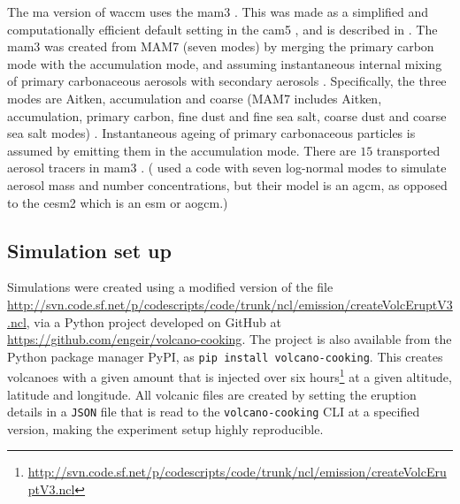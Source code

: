 \documentclass[twocol]{ametsocV5}
\begin{document}
The \acrshort{ma} version of \acrshort{waccm} uses the \acrfull{mam3}
\citep{gettleman2019}. This was made as a simplified and computationally efficient
default setting in the \acrshort{cam5} \citep{liu2016}, and is described in
\citet{liu2012}. The \acrshort{mam3} was created from MAM7 (seven modes) by merging the
primary carbon mode with the accumulation mode, and assuming instantaneous internal
mixing of primary carbonaceous aerosols with secondary aerosols \citep{liu2016}.
Specifically, the three modes are Aitken, accumulation and coarse (MAM7 includes Aitken,
accumulation, primary carbon, fine dust and fine sea salt, coarse dust and coarse sea
salt modes) \citep{liu2016}. Instantaneous ageing of primary carbonaceous particles is
assumed by emitting them in the accumulation mode. There are \(15\) transported aerosol
tracers in \acrshort{mam3} \citep{liu2016}. (\citet{marshall2019, marshall2020,
  marshall2021} used a code with seven log-normal modes to simulate aerosol mass and
number concentrations, but their model is an \acrfull{agcm}, as opposed to the
\acrshort{cesm2} which is an \acrfull{esm} or \acrfull{aogcm}.)

\subsection{Simulation set up}

Simulations were created using a modified version of the file
\url{http://svn.code.sf.net/p/codescripts/code/trunk/ncl/emission/createVolcEruptV3.ncl},
via a Python project developed on GitHub at
\url{https://github.com/engeir/volcano-cooking}. The project is also available from the
Python package manager PyPI, as \texttt{pip install volcano-cooking}. This creates
volcanoes with a given  amount that is injected over six
hours\footnote{\url{http://svn.code.sf.net/p/codescripts/code/trunk/ncl/emission/createVolcEruptV3.ncl}}
at a given altitude, latitude and longitude. All volcanic  files are created by
setting the eruption details in a \texttt{JSON} file that is read to the
\texttt{volcano-cooking} CLI at a specified version, making the experiment setup highly
reproducible.
\end{document}
